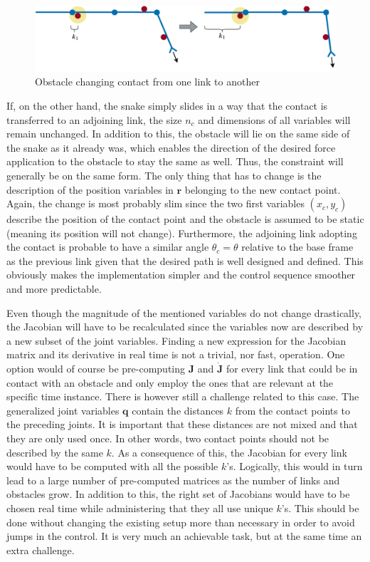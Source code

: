\begin{figure}
    \centering
    \includegraphics[width=\textwidth]{figures/theory/obst_slide_sequence2.pdf}
    \caption{Obstacle changing contact from one link to another}
    \label{fig:obst_slide_seq2}
\end{figure}

If, on the other hand, the snake simply slides in a way that the contact is transferred to an adjoining link, the size $n_c$ and dimensions of all variables will remain unchanged. In addition to this, the obstacle will lie on the same side of the snake as it already was, which enables the direction of the desired force application to the obstacle to stay the same as well. Thus, the constraint will generally be on the same form. The only thing that has to change is the description of the position variables in $\mathbf{r}$ belonging to the new contact point. Again, the change is most probably slim since the two first variables $(x_c, y_c)$ describe the position of the contact point and the obstacle is assumed to be static (meaning its position will not change). Furthermore, the adjoining link adopting the contact is probable to have a similar angle $\theta_c = \theta$ relative to the base frame as the previous link given that the desired path is well designed and defined. This obviously makes the implementation simpler and the control sequence smoother and more predictable.

Even though the magnitude of the mentioned variables do not change drastically, the Jacobian will have to be recalculated since the variables now are described by a new subset of the joint variables. Finding a new expression for the Jacobian matrix and its derivative in real time is not a trivial, nor fast, operation. One option would of course be pre-computing $\mathbf{J}$ and $\dot{\mathbf{J}}$ for every link that could be in contact with an obstacle and only employ the ones that are relevant at the specific time instance. There is however still a challenge related to this case. The generalized joint variables $\mathbf{q}$ contain the distances $k$ from the contact points to the preceding joints. It is important that these distances are not mixed and that they are only used once. In other words, two contact points should not be described by the same $k$. As a consequence of this, the Jacobian for every link would have to be computed with all the possible $k$'s. Logically, this would in turn lead to a large number of pre-computed matrices as the number of links and obstacles grow. In addition to this, the right set of Jacobians would have to be chosen real time while administering that they all use unique $k$'s. This should be done without changing the existing setup more than necessary in order to avoid jumps in the control. It is very much an achievable task, but at the same time an extra challenge.

